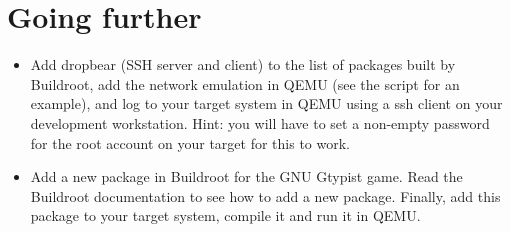 \section{Going further}

\begin{itemize}

\item Add dropbear (SSH server and client) to the list of packages
  built by Buildroot, add the network emulation in QEMU (see the
   script for an example), and log to
  your target system in QEMU using a ssh client on your development
  workstation. Hint: you will have to set a non-empty password for the
  root account on your target for this to work.

\item Add a new package in Buildroot for the GNU Gtypist game. Read
  the Buildroot documentation to see how to add a new
  package. Finally, add this package to your target system, compile it
  and run it in QEMU.

\end{itemize}
